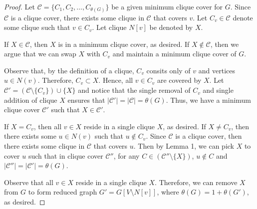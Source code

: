 \documentclass[../techreport.tex]{subfiles}
\begin{document}
\begin{proof}
	Let $\mathcal{C} = \{C_1, C_2, \dots, C_{\theta(G)}\}$ be a given minimum clique cover for $G$. Since $\mathcal{C}$ is a clique cover, there exists some clique in $\mathcal{C}$ that covers $v$. Let $C_v \in \mathcal{C}$ denote some clique such that $v \in C_v$. Let clique $N[v]$ be denoted by $X$.

	If $X \in \mathcal{C}$, then $X$ is in a minimum clique cover, as desired. If $X \notin \mathcal{C}$, then we argue that we can swap $X$ with $C_v$ and maintain a minimum clique cover of $G$.

	Observe that, by the definition of a clique, $C_v$ consits only of $v$ and vertices $u \in N(v)$. Therefore, $C_v \subset X$. Hence, all $v \in C_v$ are covered by $X$. Let $\mathcal{C'} = (\mathcal{C} \setminus \{C_v\}) \cup \{X\}$ and notice that the single removal of $C_v$ and single addition of clique $X$ ensures that $|\mathcal{C'}| = |\mathcal{C}| = \theta(G)$. Thus, we have a minimum clique cover $\mathcal{C'}$ such that $X \in \mathcal{C'}$.

	If $X = C_v$, then all $v \in X$ reside in a single clique $X$, as desired. If $X \neq C_v$, then there exists some $u \in N(v)$ such that $u \notin C_v$. Since $\mathcal{C}$ is a clique cover, then there exists some clique in $\mathcal{C}$ that covers $u$. Then by Lemma 1, we can pick $X$ to cover $u$ such that in clique cover $\mathcal{C''}$, for any $C \in (\mathcal{C''} \setminus \{X\})$, $u \notin C$ and $|\mathcal{C''}| = |\mathcal{C'}| = \theta(G)$.


	Observe that all $v \in X$ reside in a single clique $X$. Therefore, we can remove $X$ from $G$ to form reduced graph $G' = G[V \setminus N[v]]$, where $\theta(G) = 1 + \theta(G')$, as desired.
\end{proof}

\end{document}
